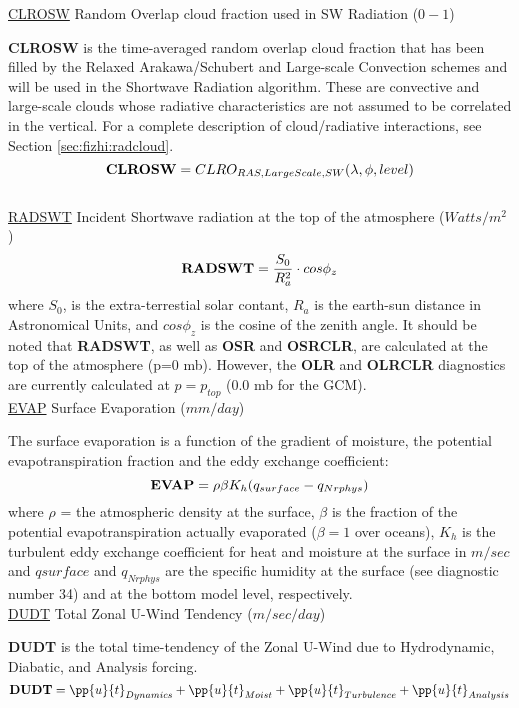 \noindent
{ \underline {CLROSW} Random Overlap cloud fraction used in SW Radiation ($0-1$) }

\noindent
{\bf CLROSW} is the time-averaged random overlap cloud fraction that has been filled by the Relaxed
Arakawa/Schubert and Large-scale Convection schemes and will be used in the Shortwave 
Radiation algorithm.  These are
convective and large-scale clouds whose radiative characteristics are not 
assumed to be correlated in the vertical.
For a complete description of cloud/radiative interactions, see Section \ref{sec:fizhi:radcloud}.
\[
{\bf CLROSW} = CLRO_{RAS,Large Scale,SW}(\lambda, \phi,  level )
\]
\\

\noindent
{ \underline {RADSWT} Incident Shortwave radiation at the top of the atmosphere ($Watts/m^2$) }
\[
{\bf RADSWT} = {\frac{S_0}{R_a^2}} \cdot cos \phi_z
\]
\noindent
where $S_0$, is the extra-terrestial solar contant,
$R_a$ is the earth-sun distance in Astronomical Units,
and $cos \phi_z$ is the cosine of the zenith angle.
It should be noted that {\bf RADSWT}, as well as
{\bf OSR} and {\bf OSRCLR}, 
are calculated at the top of the atmosphere (p=0 mb).  However, the
{\bf OLR} and {\bf OLRCLR} diagnostics are currently
calculated at $p= p_{top}$ (0.0 mb for the GCM).
\\
   
\noindent
{ \underline {EVAP}  Surface Evaporation ($mm/day$) }

\noindent
The surface evaporation is a function of the gradient of moisture, the potential 
evapotranspiration fraction and the eddy exchange coefficient:
\[
{\bf EVAP} =  \rho \beta K_{h} (q_{surface} - q_{Nrphys})
\]
where $\rho$ = the atmospheric density at the surface, $\beta$ is the fraction of
the potential evapotranspiration actually evaporated ($\beta=1$ over oceans), $K_{h}$ is the 
turbulent eddy exchange coefficient for heat and moisture at the surface in $m/sec$ and 
$q{surface}$ and $q_{Nrphys}$ are the specific humidity at the surface (see diagnostic
number 34) and at the bottom model level, respectively.
\\

\noindent
{ \underline {DUDT} Total Zonal U-Wind Tendency  ($m/sec/day$) }

\noindent
{\bf DUDT} is the total time-tendency of the Zonal U-Wind due to Hydrodynamic, Diabatic,
and Analysis forcing.
\[
{\bf DUDT} = \pp{u}{t}_{Dynamics} + \pp{u}{t}_{Moist} + \pp{u}{t}_{Turbulence} + \pp{u}{t}_{Analysis} 
\]
\\

